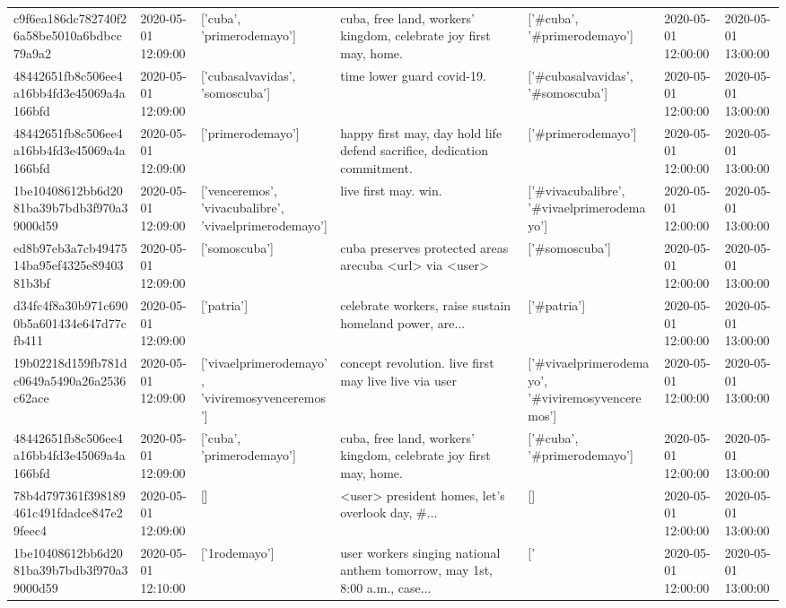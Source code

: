 \begin{tabular}{lllllll}
c9f6ea186dc782740f26a58be5010a6bdbcc79a9a2 & 2020-05-01 12:09:00 & ['cuba', 'primerodemayo'] & cuba, free land, workers' kingdom, celebrate joy first may, home. & ['#cuba', '#primerodemayo'] & 2020-05-01 12:00:00 & 2020-05-01 13:00:00 \\
48442651fb8c506ee4a16bb4fd3e45069a4a166bfd & 2020-05-01 12:09:00 & ['cubasalvavidas', 'somoscuba'] & time lower guard covid-19. & ['#cubasalvavidas', '#somoscuba'] & 2020-05-01 12:00:00 & 2020-05-01 13:00:00 \\
48442651fb8c506ee4a16bb4fd3e45069a4a166bfd & 2020-05-01 12:09:00 & ['primerodemayo'] & happy first may, day hold life defend sacrifice, dedication commitment. & ['#primerodemayo'] & 2020-05-01 12:00:00 & 2020-05-01 13:00:00 \\
1be10408612bb6d2081ba39b7bdb3f970a39000d59 & 2020-05-01 12:09:00 & ['venceremos', 'vivacubalibre', 'vivaelprimerodemayo'] & live first may. win. & ['#vivacubalibre', '#vivaelprimerodemayo'] & 2020-05-01 12:00:00 & 2020-05-01 13:00:00 \\
ed8b97eb3a7cb4947514ba95ef4325e8940381b3bf & 2020-05-01 12:09:00 & ['somoscuba'] & cuba preserves protected areas arecuba <url> via <user> & ['#somoscuba'] & 2020-05-01 12:00:00 & 2020-05-01 13:00:00 \\
d34fc4f8a30b971c6900b5a601434e647d77cfb411 & 2020-05-01 12:09:00 & ['patria'] & celebrate workers, raise sustain homeland power, are... & ['#patria'] & 2020-05-01 12:00:00 & 2020-05-01 13:00:00 \\
19b02218d159fb781dc0649a5490a26a2536c62ace & 2020-05-01 12:09:00 & ['vivaelprimerodemayo', 'viviremosyvenceremos'] & concept revolution. live first may live live via user & ['#vivaelprimerodemayo', '#viviremosyvenceremos'] & 2020-05-01 12:00:00 & 2020-05-01 13:00:00 \\
48442651fb8c506ee4a16bb4fd3e45069a4a166bfd & 2020-05-01 12:09:00 & ['cuba', 'primerodemayo'] & cuba, free land, workers' kingdom, celebrate joy first may, home. & ['#cuba', '#primerodemayo'] & 2020-05-01 12:00:00 & 2020-05-01 13:00:00 \\
78b4d797361f398189461c491fdadce847e29feec4 & 2020-05-01 12:09:00 & [] & <user> president homes, let's overlook day, \#... & [] & 2020-05-01 12:00:00 & 2020-05-01 13:00:00 \\
1be10408612bb6d2081ba39b7bdb3f970a39000d59 & 2020-05-01 12:10:00 & ['1rodemayo'] & user workers singing national anthem tomorrow, may 1st, 8:00 a.m., case... & ['#1rodemayo'] & 2020-05-01 12:00:00 & 2020-05-01 13:00:00 \\

\end{tabular}
